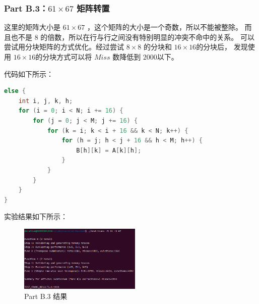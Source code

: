 \subsubsection{Part B.3：$ 61 \times 67 $ 矩阵转置}
这里的矩阵大小是 $61 \times 67$ ，这个矩阵的大小是一个奇数，所以不能被整除。
而且也不是 $ 8 $ 的倍数，所以在行与行之间没有特别明显的冲突不命中的关系。
可以尝试用分块矩阵的方式优化。经过尝试 $ 8 \times 8 $ 的分块和 $ 16 \times 16 $的分块后，
发现使用 $16 \times 16 $的分块方式可以将 $Miss$ 数降低到 $ 2000 $以下。

代码如下所示：
\begin{lstlisting}[language = C,title= Matrix Transpose]
else {
    int i, j, k, h;
    for (i = 0; i < N; i += 16) {
        for (j = 0; j < M; j += 16) {
            for (k = i; k < i + 16 && k < N; k++) {
                for (h = j; h < j + 16 && h < M; h++) {
                    B[h][k] = A[k][h];
                }
            }
        }
    }
}
\end{lstlisting}

实验结果如下所示：

\begin{figure} [H]
    \centering
    \includegraphics[width=0.52\textwidth]{PartF.png}
    \caption{Part B.3 结果}
\end{figure}





